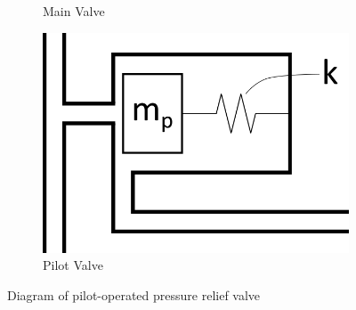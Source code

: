 \begin{figure}[ht]
\begin{minipage}{0.3\textwidth}
\begin{subfigure}{\textwidth}
        \caption{Main Valve}
        \label{fig: DiagramMain}
        \end{subfigure}
        \begin{subfigure}{\textwidth}
        \centering
        \includegraphics[width=\textwidth]{Diagrams/Diagram-Pilot.png}
        \caption{Pilot Valve}
        \label{fig: DiagramPilot}
        \end{subfigure}
    \end{minipage}
    \caption{Diagram of pilot-operated pressure relief valve}
    \label{fig: Diagram}
\end{figure}